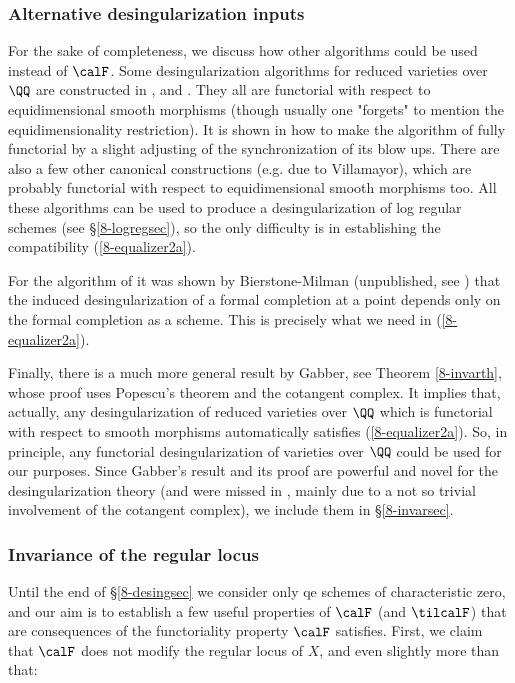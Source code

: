 \documentclass[10pt]{../fichiers-configuration-latex/smfart}
\begin{document}
\subsubsection{Alternative desingularization
inputs}\label{8-altersec} For the sake of completeness, we discuss
how other algorithms could be used instead of $\calF$. Some
desingularization algorithms for reduced varieties over $\QQ$
are constructed in \cite{BM@resolution}, \cite{Wlodarczyk} and
\cite{Kollar@resolution}. They all are functorial with respect to
equidimensional smooth morphisms (though usually one "forgets"
to mention the equidimensionality restriction). It is shown in
\cite[\S6.3]{BMT@Bierstone-Milman-Temkin} how to make the algorithm
of \cite{BM@resolution} fully functorial by a slight adjusting of
the synchronization of its blow ups. There are also a few other canonical
constructions (e.g. due to Villamayor), which are probably functorial
with respect to equidimensional smooth morphisms too. All these
algorithms can be used to produce a desingularization of log regular
schemes (see \S\ref{8-logregsec}), so the only difficulty is in
establishing the compatibility (\ref{8-equalizer2a}).

For the algorithm of \cite{BMT@Bierstone-Milman-Temkin}
it was shown by Bierstone-Milman (unpublished, see
\cite[Rem. 7.1(2)]{BMT@Bierstone-Milman-Temkin}) that the induced
desingularization of a formal completion at a point depends only on
the formal completion as a scheme. This is precisely what we need in
(\ref{8-equalizer2a}).

Finally, there is a much more general result by Gabber, see
Theorem \ref{8-invarth}, whose proof uses Popescu's theorem and the
cotangent complex. It implies that, actually, any desingularization
of reduced varieties over $\QQ$ which is functorial with respect to
smooth morphisms automatically satisfies (\ref{8-equalizer2a}). So,
in principle, any functorial desingularization of varieties over
$\QQ$ could be used for our purposes. Since Gabber's result and
its proof are powerful and novel for the desingularization theory
(and were missed in \cite{BMT@Bierstone-Milman-Temkin}, mainly
due to a not so trivial involvement of the cotangent complex),
we include them in \S\ref{8-invarsec}.

\subsubsection{Invariance of the regular locus}\label{8-consfunsec}
Until the end of \S\ref{8-desingsec} we consider only qe schemes
of characteristic zero, and our aim is to establish a few useful
properties of $\calF$ (and $\tilcalF$) that are consequences of
the functoriality property $\calF$ satisfies. First, we claim that
$\calF$ does not modify the regular locus of $X$, and even slightly
more than that:
\end{document}
